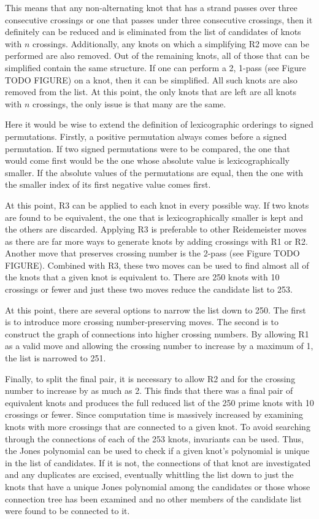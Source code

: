 \begin{paper}
This means that any non-alternating knot that has a strand passes over three
consecutive crossings or one that passes under three consecutive crossings, then
it definitely can be reduced and is eliminated from the list of candidates of
knots with $n$ crossings.
Additionally, any knots on which a simplifying R2 move can be performed are also
removed.
Out of the remaining knots, all of those that can be simplified contain the same
structure.
If one can perform a 2, 1-pass (see Figure TODO FIGURE) on a knot, then it can
be simplified.
All such knots are also removed from the list.
At this point, the only knots that are left are all knots with $n$ crossings,
the only issue is that many are the same.

Here it would be wise to extend the definition of lexicographic orderings to
signed permutations.
Firstly, a positive permutation always comes before a signed permutation.
If two signed permutations were to be compared, the one that would come first
would be the one whose absolute value is lexicographically smaller.
If the absolute values of the permutations are equal, then the one with the
smaller index of its first negative value comes first.

At this point, R3 can be applied to each knot in every possible way.
If two knots are found to be equivalent, the one that is lexicographically
smaller is kept and the others are discarded.
Applying R3 is preferable to other Reidemeister moves as there are far more ways
to generate knots by adding crossings with R1 or R2.
Another move that preserves crossing number is the 2-pass (see Figure TODO
FIGURE).
Combined with R3, these two moves can be used to find almost all of the knots
that a given knot is equivalent to.
There are 250 knots with 10 crossings or fewer and just these two moves reduce
the candidate list to 253.

At this point, there are several options to narrow the list down to 250.
The first is to introduce more crossing number-preserving moves.
The second is to construct the graph of connections into higher crossing
numbers.
By allowing R1 as a valid move and allowing the crossing number to increase by a
maximum of 1, the list is narrowed to 251.

Finally, to split the final pair, it is necessary to allow R2 and for the
crossing number to increase by as much as 2.
This finds that there was a final pair of equivalent knots and produces the full
reduced list of the 250 prime knots with 10 crossings or fewer.
Since computation time is massively increased by examining knots with more
crossings that are connected to a given knot.
To avoid searching through the connections of each of the 253 knots, invariants
can be used.
Thus, the Jones polynomial can be used to check if a given knot's polynomial is
unique in the list of candidates.
If it is not, the connections of that knot are investigated and any duplicates
are excised, eventually whittling the list down to just the knots that have a
unique Jones polynomial among the candidates or those whose connection tree has
been examined and no other members of the candidate list were found to be
connected to it.


\end{paper}
